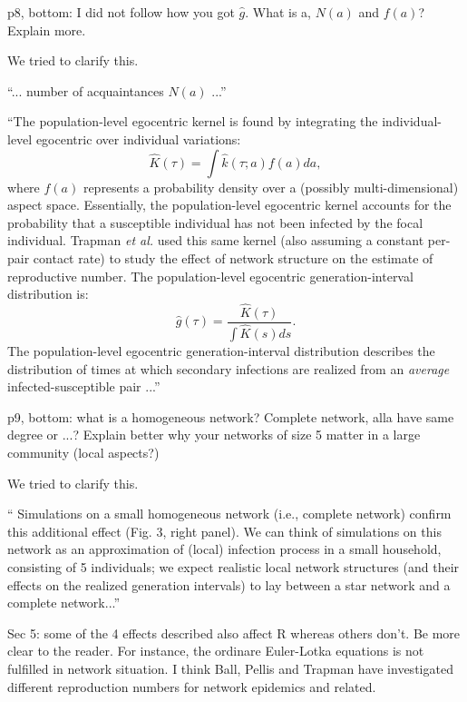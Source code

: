 \documentclass[12pt]{article}
\newcommand{\revtext}{\textsf}
\begin{document}
\revtext{p8, bottom: I did not follow how you got $\hat g$. What is a, $N(a)$ and $f(a)$? Explain more.}

We tried to clarify this.

``... number of acquaintances $N(a)$ ...''

``The population-level egocentric kernel is found by integrating the individual-level egocentric over individual variations:
\begin{equation}\label{eq:ego}
\hat{K}(\tau) = \int \hat{k}(\tau; a) f(a) da,
\end{equation}
where $f(a)$ represents a probability density over a (possibly multi-dimensional) aspect space.
Essentially, the population-level egocentric kernel accounts for the probability that a susceptible individual has not been infected by the focal individual.
Trapman \textit{et al.} used this same kernel (also assuming a constant per-pair contact rate) to study the effect of network structure on the estimate of reproductive number.
The population-level egocentric generation-interval distribution is:
\begin{equation}
\hat{g}(\tau) = \frac{\hat{K}(\tau)}{\int \hat{K}(s) ds}.
\label{eq:conditional}
\end{equation}
The population-level egocentric generation-interval distribution describes the distribution of times at which secondary infections are realized from an \emph{average} infected-susceptible pair ...''

\revtext{p9, bottom: what is a homogeneous network? Complete network, alla have same degree or ...? Explain better why your networks of size 5 matter in a large community (local aspects?)}

We tried to clarify this.

``
Simulations on a small homogeneous network (i.e., complete network) confirm this additional effect (Fig. 3, right panel). We can think of simulations on this network as an approximation of (local) infection process in a small household, consisting of 5 individuals;
we expect realistic local network structures (and their effects on the realized generation intervals) to lay between a star network and a complete network...''

\revtext{Sec 5: some of the 4 effects described also affect R whereas others don't. Be more clear to the reader. For instance, the ordinare Euler-Lotka equations is not fulfilled in network situation. I think Ball, Pellis and Trapman have investigated different reproduction numbers for network epidemics and related.}
\end{document}
